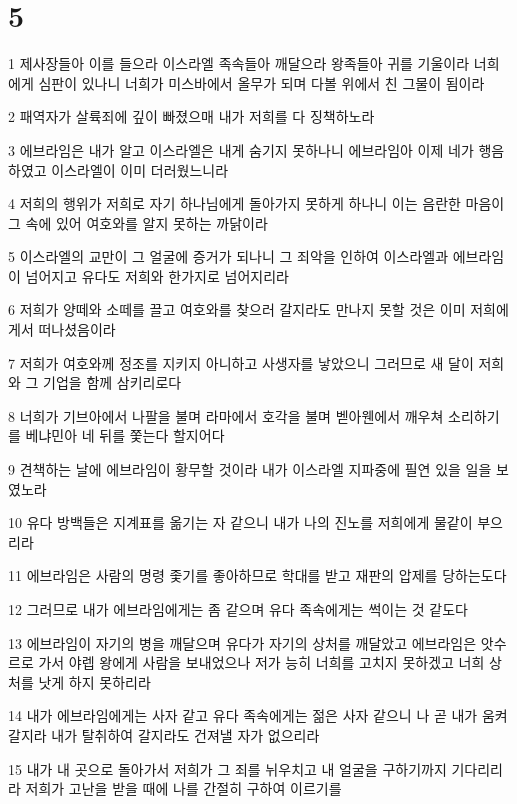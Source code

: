 \chapter{5}

\par 1 제사장들아 이를 들으라 이스라엘 족속들아 깨달으라 왕족들아 귀를 기울이라 너희에게 심판이 있나니 너희가 미스바에서 올무가 되며 다볼 위에서 친 그물이 됨이라
\par 2 패역자가 살륙죄에 깊이 빠졌으매 내가 저희를 다 징책하노라
\par 3 에브라임은 내가 알고 이스라엘은 내게 숨기지 못하나니 에브라임아 이제 네가 행음하였고 이스라엘이 이미 더러웠느니라
\par 4 저희의 행위가 저희로 자기 하나님에게 돌아가지 못하게 하나니 이는 음란한 마음이 그 속에 있어 여호와를 알지 못하는 까닭이라
\par 5 이스라엘의 교만이 그 얼굴에 증거가 되나니 그 죄악을 인하여 이스라엘과 에브라임이 넘어지고 유다도 저희와 한가지로 넘어지리라
\par 6 저희가 양떼와 소떼를 끌고 여호와를 찾으러 갈지라도 만나지 못할 것은 이미 저희에게서 떠나셨음이라
\par 7 저희가 여호와께 정조를 지키지 아니하고 사생자를 낳았으니 그러므로 새 달이 저희와 그 기업을 함께 삼키리로다
\par 8 너희가 기브아에서 나팔을 불며 라마에서 호각을 불며 벧아웬에서 깨우쳐 소리하기를 베냐민아 네 뒤를 쫓는다 할지어다
\par 9 견책하는 날에 에브라임이 황무할 것이라 내가 이스라엘 지파중에 필연 있을 일을 보였노라
\par 10 유다 방백들은 지계표를 옮기는 자 같으니 내가 나의 진노를 저희에게 물같이 부으리라
\par 11 에브라임은 사람의 명령 좇기를 좋아하므로 학대를 받고 재판의 압제를 당하는도다
\par 12 그러므로 내가 에브라임에게는 좀 같으며 유다 족속에게는 썩이는 것 같도다
\par 13 에브라임이 자기의 병을 깨달으며 유다가 자기의 상처를 깨달았고 에브라임은 앗수르로 가서 야렙 왕에게 사람을 보내었으나 저가 능히 너희를 고치지 못하겠고 너희 상처를 낫게 하지 못하리라
\par 14 내가 에브라임에게는 사자 같고 유다 족속에게는 젊은 사자 같으니 나 곧 내가 움켜갈지라 내가 탈취하여 갈지라도 건져낼 자가 없으리라
\par 15 내가 내 곳으로 돌아가서 저희가 그 죄를 뉘우치고 내 얼굴을 구하기까지 기다리리라 저희가 고난을 받을 때에 나를 간절히 구하여 이르기를

